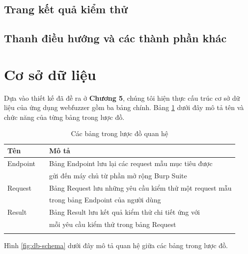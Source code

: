 \subsection{Trang kết quả kiểm thử}

\subsection{Thanh điều hướng và các thành phần khác}


\section{Cơ sở dữ liệu}
Dựa vào thiết kế đã đề ra ở \textbf{Chương 5}, chúng tôi hiện thực cấu trúc cơ sở dữ liệu của ứng dụng webfuzzer gồm ba bảng chính. Bảng \ref{tab:db-tables} dưới đây mô tả tên và chức năng của từng bảng trong lược đồ.
\begin{table}[ht]
    \centering
    \caption{Các bảng trong lược đồ quan hệ}
    \label{tab:db-tables}
    \begin{tabular}[ht]{lll}
        \toprule[1pt]\midrule[0.3pt]
            \textbf{Tên}& &\textbf{Mô tả}\\ 
        \midrule
            Endpoint& &Bảng Endpoint lưu lại các request mẫu mục tiêu được\\
            {}& &gửi đến máy chủ từ phần mở rộng Burp Suite\\
            \addlinespace
            Request& &Bảng Request lưu những yêu cầu kiểm thử một request mẫu \\
            {}& &trong bảng Endpoint của người dùng\\
            \addlinespace
            Result& &Bảng Result lưu kết quả kiểm thử chi tiết ứng với\\
            {}& &mỗi yêu cầu kiểm thử trong bảng Request\\
            \addlinespace
        \midrule[0.3pt]\bottomrule[1pt]
    \end{tabular}
\end{table}
\FloatBarrier
Hình \ref{fig:db-schema} dưới đây mô tả quan hệ giữa các bảng trong lược đồ.

